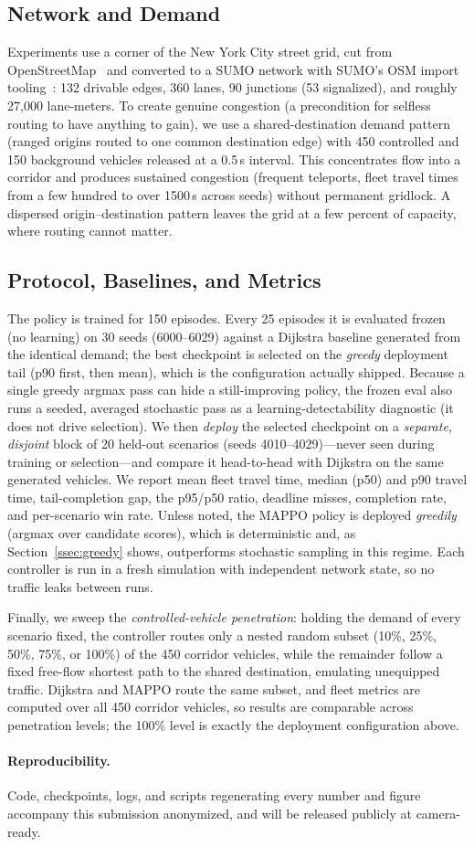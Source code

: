 \subsection{Network and Demand}
Experiments use a corner of the New York City street grid, cut from
OpenStreetMap~\citep{osm} and converted to a SUMO network with SUMO's OSM import
tooling~\citep{lopez2018sumo}: 132 drivable edges, 360 lanes, 90 junctions (53
signalized), and roughly 27{,}000 lane-meters. To create genuine
congestion (a precondition for selfless routing to have anything to gain), we use a
shared-destination demand pattern (ranged origins routed to one common destination edge)
with 450 controlled and 150 background vehicles released at a 0.5\,s interval. This
concentrates flow into a corridor and produces sustained congestion (frequent teleports,
fleet travel times from a few hundred to over 1500\,s across seeds) without permanent
gridlock. A dispersed origin--destination pattern leaves the grid at a few percent of
capacity, where routing cannot matter.

\subsection{Protocol, Baselines, and Metrics}
The policy is trained for 150 episodes. Every 25 episodes it is evaluated frozen (no
learning) on 30 seeds (6000--6029) against a Dijkstra baseline generated from the
identical demand; the best checkpoint is selected on the \emph{greedy} deployment tail
(p90 first, then mean), which is the configuration actually shipped. Because a single
greedy argmax pass can hide a still-improving policy, the frozen eval also runs a seeded,
averaged stochastic pass as a learning-detectability diagnostic (it does not drive
selection). We then \emph{deploy} the selected checkpoint on a \emph{separate, disjoint}
block of 20 held-out scenarios (seeds 4010--4029)---never seen during training or
selection---and compare it head-to-head with Dijkstra on the same generated vehicles. We
report mean fleet travel time, median (p50) and p90 travel time, tail-completion gap, the
p95/p50 ratio, deadline misses, completion rate, and per-scenario win rate. Unless noted,
the MAPPO policy is deployed \emph{greedily} (argmax over candidate scores), which is
deterministic and, as Section~\ref{ssec:greedy} shows, outperforms stochastic sampling in
this regime. Each controller is run in a fresh simulation with independent network state,
so no traffic leaks between runs.

Finally, we sweep the \emph{controlled-vehicle penetration}: holding the demand of every
scenario fixed, the controller routes only a nested random subset (10\%, 25\%, 50\%,
75\%, or 100\%) of the 450 corridor vehicles, while the remainder follow a fixed
free-flow shortest path to the shared destination, emulating unequipped traffic.
Dijkstra and MAPPO route the same subset, and fleet metrics are computed over all 450
corridor vehicles, so results are comparable across penetration levels; the 100\% level
is exactly the deployment configuration above.

\paragraph{Reproducibility.}
Code, checkpoints, logs, and scripts regenerating every number and figure accompany
this submission anonymized, and will be released publicly at camera-ready.

